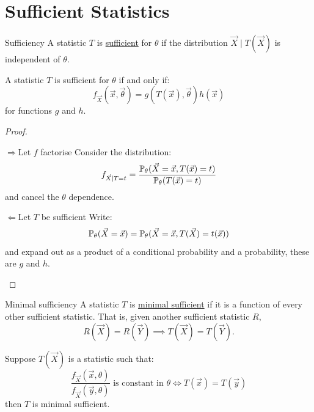 \documentclass[../Main.tex]{subfiles}
\begin{document}
\section{Sufficient Statistics}
\begin{definition}{Sufficiency}
    A statistic $T$ is \underline{sufficient} for $\theta$ if the distribution $\vec{X} \mid T(\vec{X})$ is independent of $\theta$.
\end{definition}
\begin{theorem}
    A statistic $T$ is sufficient for $\theta$ if and only if:
    \begin{equation*}
        f_{\vec{X}}(\vec{x}, \vec{\theta}) = g(T(\vec{x}), \vec{\theta}) h(\vec{x})
    \end{equation*}
    for functions $g$ and $h$.
    \label{thmFactorCriterion}
\end{theorem}
\begin{proof}
    \begin{proofdirection}{$\Rightarrow$}{Let $f$ factorise}
        Consider the distribution:
        \begin{equation*}
            f_{\vec{X} \mid T = t} = \frac{\P_\theta(\vec{X} = \vec{x}, T(\vec{x}) = t)}{\P_\theta(T(\vec{x}) = t)}
        \end{equation*}
        and cancel the $\theta$ dependence.
    \end{proofdirection}
    \begin{proofdirection}{$\Leftarrow$}{Let $T$ be sufficient}
        Write:
        \begin{equation*}
            \P_\theta(\vec{X} = \vec{x}) = \P_\theta(\vec{X} = \vec{x}, T(\vec{X}) = t(\vec{x}))
        \end{equation*}
        and expand out as a product of a conditional probability and a probability, these are $g$ and $h$.
    \end{proofdirection}
\end{proof}
\begin{definition}{Minimal sufficiency}
    A statistic $T$ is \underline{minimal sufficient} if it is a function of every other sufficient statistic. That is, given another sufficient statistic $R$,
    \begin{equation*}
        R(\vec{X}) = R(\vec{Y}) \implies T(\vec{X}) = T(\vec{Y}).
    \end{equation*}
\end{definition}
\begin{theorem}
    Suppose $T(\vec{X})$ is a statistic such that:
    \begin{equation*}
        \frac{f_{\vec{X}}(\vec{x}, \theta)}{f_{\vec{X}}(\vec{y}, \theta)} \text{ is constant in $\theta$} \iff T(\vec{x}) = T(\vec{y})
    \end{equation*}
    then $T$ is minimal sufficient.
    \label{thmMinimalCriterion}
\end{theorem}
\end{document}
